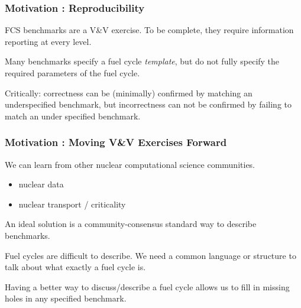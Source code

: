 \begin{frame}[ctb!]
  \frametitle{Motivation : Reproducibility} 

  FCS benchmarks are a V\&V exercise. To be complete, they require information
  reporting at every level.

  \vspace{0.4cm}

  Many benchmarks specify a fuel cycle \textit{template}, but do not fully 
  specify the required parameters of the fuel cycle.

  \vspace{0.4cm}

  Critically: correctness can be (minimally) confirmed by matching an
  underspecified benchmark, but incorrectness can not be confirmed by failing to
  match an under specified benchmark.
\end{frame}

\begin{frame}[ctb!]
  \frametitle{Motivation : Moving V\&V Exercises Forward}
  We can learn from other nuclear computational science communities.
  \begin{itemize}
    \item nuclear data \cite{mattoon_generalized_2012}
    \item nuclear transport / criticality
  \end{itemize}

  An ideal solution is a community-consensus standard way to describe benchmarks.

  \vspace{0.4cm}

  Fuel cycles are difficult to describe. We need a common language or structure
  to talk about what exactly a fuel cycle is.

  \vspace{0.4cm}

  Having a better way to discuss/describe a fuel cycle allows us to fill in
  missing holes in any specified benchmark.
\end{frame}

